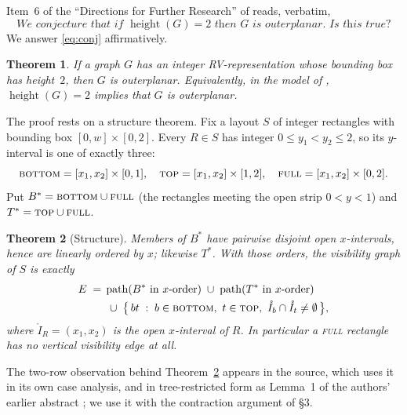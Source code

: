 \documentclass[11pt]{amsart}
\newtheorem{theorem}{Theorem}
\theoremstyle{remark}
\newcommand{\Bs}{B^{*}}
\newcommand{\Ts}{T^{*}}
\newcommand{\height}{\operatorname{height}}
\begin{document}
Item~6 of the ``Directions for Further Research'' of \cite{CDLNS23} reads, verbatim,
\begin{equation}\label{eq:conj}
 \textit{We conjecture that if } \height(G)=2 \textit{ then } G \textit{ is
 outerplanar. Is this true?}
\end{equation}
We answer \eqref{eq:conj} affirmatively.

\begin{theorem}\label{thm:main}
If a graph $G$ has an integer RV-representation whose bounding box has height~$2$,
then $G$ is outerplanar. Equivalently, in the model of \cite{CDLNS23},
$\height(G)=2$ implies that $G$ is outerplanar.
\end{theorem}

The proof rests on a structure theorem. Fix a layout $S$ of integer rectangles with
bounding box $[0,w]\times[0,2]$. Every $R\in S$ has integer $0\le y_1<y_2\le2$, so its
$y$-interval is one of exactly three:
\[
 \textsc{bottom}=[x_1,x_2]\times[0,1],\quad
 \textsc{top}=[x_1,x_2]\times[1,2],\quad
 \textsc{full}=[x_1,x_2]\times[0,2].
\]
Put $\Bs=\textsc{bottom}\cup\textsc{full}$ (the rectangles meeting the open strip
$0<y<1$) and $\Ts=\textsc{top}\cup\textsc{full}$.

\begin{theorem}[Structure]\label{thm:A}
Members of $\Bs$ have pairwise disjoint open $x$-intervals, hence are linearly ordered
by $x$; likewise $\Ts$. With those orders, the visibility graph of $S$ is exactly
\begin{align*}
 E \;=\;& \operatorname{path}(\Bs\text{ in }x\text{-order})
 \;\cup\; \operatorname{path}(\Ts\text{ in }x\text{-order})\\
 &\;\cup\; \bigl\{\,bt \;:\; b\in\textsc{bottom},\ t\in\textsc{top},\
 \mathring{I}_b\cap \mathring{I}_t\neq\emptyset \,\bigr\},
\end{align*}
where $\mathring{I}_R=(x_1,x_2)$ is the open $x$-interval of $R$. In particular a
\textsc{full} rectangle has no vertical visibility edge at all.
\end{theorem}

The two-row observation behind Theorem~\ref{thm:A} appears in the source, which uses it
in its own case analysis, and in tree-restricted form as Lemma~1 of the authors'
earlier abstract \cite{CDLNS14}; we use it with the contraction argument of \S3.
\end{document}
